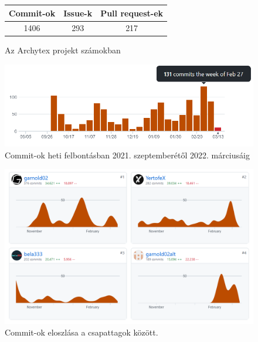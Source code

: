 \begin{figure}[h]
  \begin{center}
    \begin{tabular}{|c|c|c|}
      \hline
      Commit-ok & Issue-k & Pull request-ek \\
      \hline
      1406      & 293     & 217             \\
      \hline
    \end{tabular}
    \caption{Az Archytex projekt számokban}
  \end{center}
\end{figure}

\begin{figure}[h]
  \centering
  \includegraphics[width=.82\textwidth]{parts/developer-documentation/work/images/commits.png}
  \caption{Commit-ok heti felbontásban 2021. szeptemberétől 2022. márciusáig}
\end{figure}

\begin{figure}[h]
  \centering
  \includegraphics[width=.65\textwidth]{parts/developer-documentation/work/images/commit-frequency.png}
  \caption{Commit-ok eloszlása a csapattagok között.}
\end{figure}